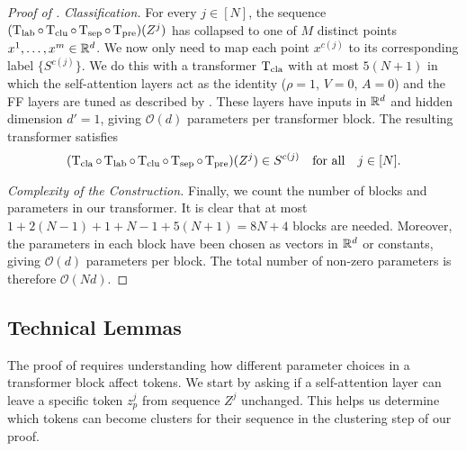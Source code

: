 \documentclass[11pt,a4paper]{amsart}
\begin{document}
\begin{proof}[Proof of ]
\noindent\textit{Classification.} 
For every $j \in [N]$, the sequence $(\operatorname{\mathrm{T}}_{\text{lab}}\circ\operatorname{\mathrm{T}}_{\text{clu}}\circ \operatorname{\mathrm{T}}_{\text{sep}}\circ \operatorname{\mathrm{T}}_{\text{pre}})(Z^j)$ has collapsed to one of $M$ distinct points $x^1,\ldots,x^m \in \mathbb{R}^d$. We now only need to map each point $x^{c(j)}$ to its corresponding label $\{ S^{c(j)}\}$. We do this with a transformer $\operatorname{\mathrm{T}}_{\text{cla}}$ with at most $5(N+1)$ in which the self-attention layers act as the identity ($\rho = 1$, $V = 0$, $A = 0$) and the FF layers are tuned as described by \cite[Theorem~4.1]{domenec2023NODES}. These layers have inputs in $\mathbb{R}^d$ and hidden dimension $d' = 1$, giving $\mathcal{O}(d)$ parameters per transformer block.
The resulting transformer satisfies 
\begin{equation}
    (\operatorname{\mathrm{T}}_{\text{cla}} \circ \operatorname{\mathrm{T}}_{\text{lab}}\circ \operatorname{\mathrm{T}}_{\text{clu}} \circ \operatorname{\mathrm{T}}_{\text{sep}} \circ \operatorname{\mathrm{T}}_{\text{pre}})(Z^j) \in S^{c(j)} \quad \text{for all} \quad j\in [N].
\end{equation}

\noindent\textit{Complexity of the Construction.}
Finally, we count the number of blocks and parameters in our transformer. It is clear that at most $1 + 2(N-1) + 1 + N-1 + 5(N+1) = 8N + 4$ blocks are needed. Moreover, the parameters in each block have been chosen as vectors in $\mathbb{R}^d$ or constants, giving $\mathcal{O}(d)$ parameters per block. The total number of non-zero parameters is therefore $\mathcal{O}(Nd)$.
\end{proof}
%
\subsection{Technical Lemmas}\label{sec:lemmas}
The proof of  requires understanding how different parameter choices in a transformer block affect tokens. We start by asking if a self-attention layer can leave a specific token $z_p^j$ from sequence $Z^j$ unchanged. This helps us determine which tokens can become clusters for their sequence in the clustering step of our proof. 
\end{document}
